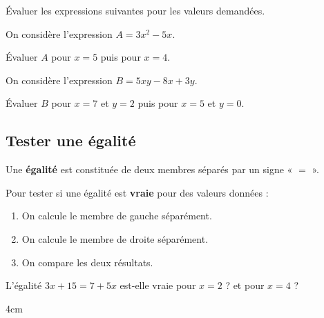 \documentclass[a4paper]{book}
\begin{document}
    
    \begin{exemple}
        Évaluer les expressions suivantes pour les valeurs demandées.

        \smallskip

        \begin{minipage}{0.49\linewidth}
            On considère l'expression $A=3x^2-5x$.

            \smallskip

            Évaluer $A$ pour $x=5$ puis pour $x=4$.

            \vspace{4.5cm}
        \end{minipage}
        \hfill\vline\hfill
        \begin{minipage}{0.49\linewidth}
            On considère l'expression $B=5xy-8x+3y$.

            \smallskip

            Évaluer $B$ pour $x=7$ et $y=2$ puis pour $x=5$ et $y=0$.

            \vspace{4.5cm}
        \end{minipage}
    \end{exemple}
    
    
\subsection{Tester une égalité}
    
    \begin{definition}[Égalité]
        Une \textbf{égalité} est constituée de deux membres séparés par un signe « $=$ ».
    \end{definition}
    
    
    \begin{methode}
        Pour tester si une égalité est \textbf{vraie} pour des valeurs données :
        \begin{enumerate}
            \item On calcule le membre de gauche séparément.
            \item On calcule le membre de droite séparément.
            \item On compare les deux résultats.
        \end{enumerate}
    \end{methode}
    
    
    \begin{exemple}
        L'égalité $3x + 15 = 7 + 5x$ est-elle vraie pour $x = 2$ ? et pour $x = 4$ ?
        \begin{ZoneReponse}{4cm}
            
        \end{ZoneReponse}
    \end{exemple}
    
\end{document}
